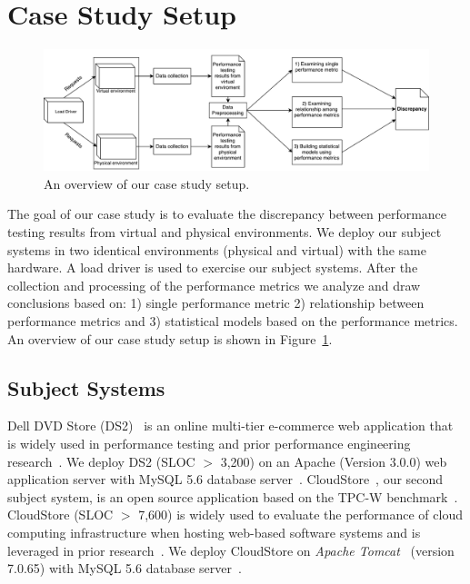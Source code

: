 \documentclass[smallextended]{svjour3}       %
\begin{document}
\section{Case Study Setup}
\label{sec:case}

\begin{figure}[thb]
	\includegraphics[width=.9\textwidth]{overview}
	\caption{An overview of our case study setup.}
	\label{fig:Approach}
\end{figure}

The goal of our case study is to evaluate the discrepancy between performance testing results from virtual and physical environments. We deploy our subject systems in two identical environments (physical and virtual) with the same hardware. A load driver is used to exercise our subject systems. After the collection and processing of the performance metrics we analyze and draw conclusions based on: 1) single performance metric 2) relationship between performance metrics and 3) statistical models based on the performance metrics. An overview of our case study setup is shown in Figure~\ref{fig:Approach}.


\subsection{Subject Systems}
Dell DVD Store (DS2)~\cite{delldvd} is an online multi-tier e-commerce web application that is widely used in performance testing and prior performance engineering research~\cite{Shang:2015:ADP:2668930.2688052,Nguyen:2012:ADP:2188286.2188344, jackicsm2009}. We deploy DS2 (SLOC $>$ 3,200) on an Apache (Version 3.0.0) web application server with MySQL 5.6 database server~\cite{mysql}. CloudStore~\cite{cloudstore}, our second subject system, is an open source application based on the TPC-W benchmark~\cite{tpcw}. CloudStore (SLOC $>$ 7,600) is widely used to evaluate the performance of cloud computing infrastructure when hosting web-based software systems and is leveraged in prior research~\cite{tarekmsr16}. We deploy CloudStore on \textit{Apache Tomcat}~\cite{tomcat} (version 7.0.65) with MySQL 5.6 database server~\cite{mysql}.
\end{document}
